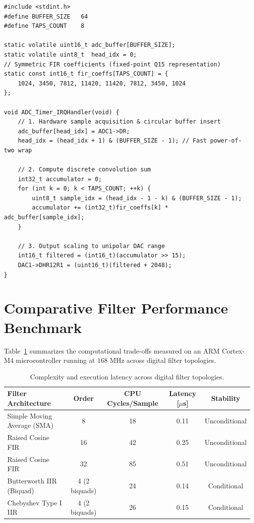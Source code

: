 \documentclass[
  lang=english,
  accent=0055A4,      %
  circuits=true,      %
  qed=smiley          %
]{opalith}
\begin{document}
\begin{lstlisting}[caption={Embedded C timer ISR for periodic ADC sampling and FIR filtering.}, label={lst:fir_isr}]
#include <stdint.h>
#define BUFFER_SIZE   64
#define TAPS_COUNT    8

static volatile uint16_t adc_buffer[BUFFER_SIZE];
static volatile uint8_t  head_idx = 0;
// Symmetric FIR coefficients (fixed-point Q15 representation)
static const int16_t fir_coeffs[TAPS_COUNT] = {
    1024, 3450, 7812, 11420, 11420, 7812, 3450, 1024
};

void ADC_Timer_IRQHandler(void) {
    // 1. Hardware sample acquisition & circular buffer insert
    adc_buffer[head_idx] = ADC1->DR;
    head_idx = (head_idx + 1) & (BUFFER_SIZE - 1); // Fast power-of-two wrap

    // 2. Compute discrete convolution sum
    int32_t accumulator = 0;
    for (int k = 0; k < TAPS_COUNT; ++k) {
        uint8_t sample_idx = (head_idx - 1 - k) & (BUFFER_SIZE - 1);
        accumulator += (int32_t)fir_coeffs[k] * adc_buffer[sample_idx];
    }

    // 3. Output scaling to unipolar DAC range
    int16_t filtered = (int16_t)(accumulator >> 15);
    DAC1->DHR12R1 = (uint16_t)(filtered + 2048);
}
\end{lstlisting}

\section{Comparative Filter Performance Benchmark}
\label{sec:benchmark_table}

Table~\ref{tab:filter_comparison} summarizes the computational trade-offs measured on an ARM Cortex-M4 microcontroller running at $168\text{ MHz}$ across digital filter topologies.

\begin{table}[htbp]
\centering
\begin{tabular}{lcccc}
\toprule
\textbf{Filter Architecture} & \textbf{Order} & \textbf{CPU Cycles/Sample} & \textbf{Latency [$\mu$s]} & \textbf{Stability} \\
\midrule
Simple Moving Average (SMA)  & 8               & 18                         & 0.11                      & Unconditional      \\
Raised Cosine FIR            & 16              & 42                         & 0.25                      & Unconditional      \\
Raised Cosine FIR            & 32              & 85                         & 0.51                      & Unconditional      \\
Butterworth IIR (Biquad)     & 4 (2 biquads)   & 24                         & 0.14                      & Conditional        \\
Chebyshev Type I IIR         & 4 (2 biquads)   & 26                         & 0.15                      & Conditional        \\
\bottomrule
\end{tabular}
\caption{Complexity and execution latency across digital filter topologies.}
\label{tab:filter_comparison}
\end{table}
\end{document}
